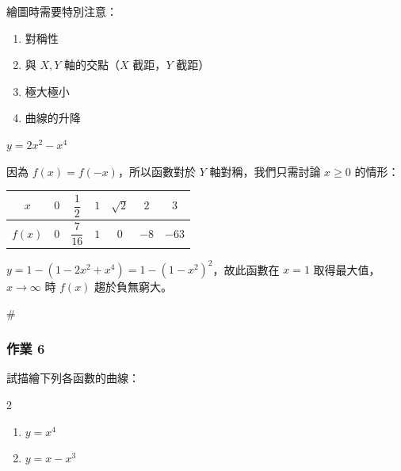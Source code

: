 繪圖時需要特別注意：
\begin{enumerate}[label=(\arabic*), leftmargin=2em]
  \item 對稱性
  \item 與 $X, Y$ 軸的交點（$X$ 截距，$Y$ 截距）
  \item 極大極小
  \item 曲線的升降
\end{enumerate}

\begin{example}\label{ex:b6-2-7}
$y = 2x^2 - x^4$
\end{example}

因為 $f(x)=f(-x)$，所以函數對於 $Y$ 軸對稱，我們只需討論 $x \ge 0$ 的情形：

\begin{center}
\small
\renewcommand{\arraystretch}{1.2}
\begin{tabular}{|c|c|c|c|c|c|c|}
\hline
$x$ & $0$ & $\dfrac{1}{2}$ & $1$ & $\sqrt{2}$ & $2$ & $3$ \\ \hline
$f(x)$ & $0$ & $\dfrac{7}{16}$ & $1$ & $0$ & $-8$ & $-63$ \\ \hline
\end{tabular}
\end{center}

$y = 1 - (1-2x^2+x^4) = 1 - (1-x^2)^2$，故此函數在 $x=1$ 取得最大值，$x \longrightarrow \infty$ 時 $f(x)$ 趨於負無窮大。

\begin{figure}[H]
\centering
{}
\end{figure}
\hfill$\#$

\subsubsection*{作業 6}\label{hw:b6-2-6}
試描繪下列各函數的曲線：
\begin{multicols}{2}
\begin{enumerate}[label=(\roman*)]
  \item $y = x^4$
  \item $y = x - x^3$
\end{enumerate}
\end{multicols}

